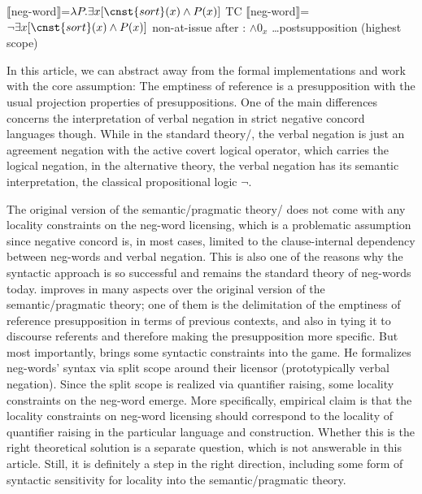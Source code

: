 \documentclass[output=paper,colorlinks,citecolor=brown]{langscibook}
\begin{document}
\ea\label{ex-13} \ea\label{ex-13-a} $\llbracket$neg-word$\rrbracket$=$\lambda P.\exists x[\cnst{sort}(x) \wedge P(x)]$
  \hfill TC 
\ex\label{ex-13-b}   $\llbracket$neg-word$\rrbracket$=$\neg \exists x[\cnst{sort}(x) \wedge P(x)]$
  \hfill non-at-issue 
\ex\label{ex-13-c} after \textcite{kuhn2022dynamics}:
  $\wedge 0_x$ \ldots postsupposition (highest scope) \z\z
  
\noindent In this article, we can abstract away from the formal implementations and work with the core assumption: The emptiness of reference is a presupposition with the usual projection properties of presuppositions. One of the main differences concerns the interpretation of verbal negation in strict negative concord languages though. While in the standard theory/\citet{zeijlstra2004sentential}, the verbal negation is just an agreement negation with the active covert logical operator, which carries the logical negation, in the alternative theory, the verbal negation has its semantic interpretation, the classical propositional logic $\neg$.

The original version of the semantic/pragmatic theory/\citet{ovalle2004double} does not come with any locality constraints on the neg-word licensing, which is a problematic assumption since negative concord is, in most cases, limited to the clause-internal dependency between neg-words and verbal negation. This is also one of the reasons why the syntactic approach is so successful and remains the standard theory of neg-words today. \citet{kuhn2022dynamics} improves in many aspects over the original version of the semantic/pragmatic theory; one of them is the delimitation of the emptiness of reference presupposition in terms of previous contexts, and also in tying it to discourse referents and therefore making the presupposition more specific. But most importantly, \citet{kuhn2022dynamics} brings some syntactic constraints into the game. He formalizes neg-words' syntax via split scope around their licensor (prototypically verbal negation). Since the split scope is realized via quantifier raising, some locality constraints on the neg-word emerge. More specifically,  empirical claim is that the locality constraints on neg-word licensing should correspond to the locality of quantifier raising in the particular language and construction. Whether this is the right theoretical solution is a separate question, which is not answerable in this article. Still, it is definitely a step in the right direction, including some form of syntactic sensitivity for locality into the semantic/pragmatic theory.
\end{document}
